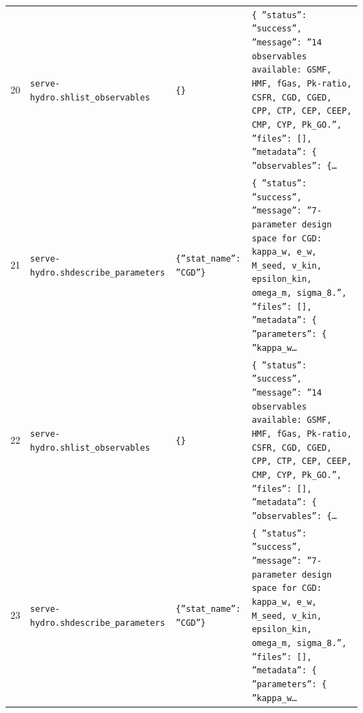 \documentclass[11pt,a4paper]{article}
\begin{document}
\begin{longtable}{@{}p{}p{}p{}p{}@{}}
20 & \texttt{serve-hydro.sh}\newline\texttt{list\_\allowbreak{}observables} & \texttt{\{\}\allowbreak{}} & \texttt{\{   ''status'':\allowbreak{} ''success'',\allowbreak{}   ''message'':\allowbreak{} ''14 observables available:\allowbreak{} GSMF,\allowbreak{} HMF,\allowbreak{} fGas,\allowbreak{} Pk-ratio,\allowbreak{} CSFR,\allowbreak{} CGD,\allowbreak{} CGED,\allowbreak{} CPP,\allowbreak{} CTP,\allowbreak{} CEP,\allowbreak{} CEEP,\allowbreak{} CMP,\allowbreak{} CYP,\allowbreak{} Pk\_\allowbreak{}GO.'',\allowbreak{}   ''files'':\allowbreak{} []\allowbreak{},\allowbreak{}   ''metadata'':\allowbreak{} \{     ''observables'':\allowbreak{} \{\ldots{}\allowbreak{}} \\
21 & \texttt{serve-hydro.sh}\newline\texttt{describe\_\allowbreak{}parameters} & \texttt{\{''stat\_\allowbreak{}name'':\allowbreak{} ''CGD''\}\allowbreak{}} & \texttt{\{   ''status'':\allowbreak{} ''success'',\allowbreak{}   ''message'':\allowbreak{} ''7-parameter design space for CGD:\allowbreak{} kappa\_\allowbreak{}w,\allowbreak{} e\_\allowbreak{}w,\allowbreak{} M\_\allowbreak{}seed,\allowbreak{} v\_\allowbreak{}kin,\allowbreak{} epsilon\_\allowbreak{}kin,\allowbreak{} omega\_\allowbreak{}m,\allowbreak{} sigma\_\allowbreak{}8.'',\allowbreak{}   ''files'':\allowbreak{} []\allowbreak{},\allowbreak{}   ''metadata'':\allowbreak{} \{     ''parameters'':\allowbreak{} \{       ''kappa\_\allowbreak{}w\ldots{}\allowbreak{}} \\
22 & \texttt{serve-hydro.sh}\newline\texttt{list\_\allowbreak{}observables} & \texttt{\{\}\allowbreak{}} & \texttt{\{   ''status'':\allowbreak{} ''success'',\allowbreak{}   ''message'':\allowbreak{} ''14 observables available:\allowbreak{} GSMF,\allowbreak{} HMF,\allowbreak{} fGas,\allowbreak{} Pk-ratio,\allowbreak{} CSFR,\allowbreak{} CGD,\allowbreak{} CGED,\allowbreak{} CPP,\allowbreak{} CTP,\allowbreak{} CEP,\allowbreak{} CEEP,\allowbreak{} CMP,\allowbreak{} CYP,\allowbreak{} Pk\_\allowbreak{}GO.'',\allowbreak{}   ''files'':\allowbreak{} []\allowbreak{},\allowbreak{}   ''metadata'':\allowbreak{} \{     ''observables'':\allowbreak{} \{\ldots{}\allowbreak{}} \\
23 & \texttt{serve-hydro.sh}\newline\texttt{describe\_\allowbreak{}parameters} & \texttt{\{''stat\_\allowbreak{}name'':\allowbreak{} ''CGD''\}\allowbreak{}} & \texttt{\{   ''status'':\allowbreak{} ''success'',\allowbreak{}   ''message'':\allowbreak{} ''7-parameter design space for CGD:\allowbreak{} kappa\_\allowbreak{}w,\allowbreak{} e\_\allowbreak{}w,\allowbreak{} M\_\allowbreak{}seed,\allowbreak{} v\_\allowbreak{}kin,\allowbreak{} epsilon\_\allowbreak{}kin,\allowbreak{} omega\_\allowbreak{}m,\allowbreak{} sigma\_\allowbreak{}8.'',\allowbreak{}   ''files'':\allowbreak{} []\allowbreak{},\allowbreak{}   ''metadata'':\allowbreak{} \{     ''parameters'':\allowbreak{} \{       ''kappa\_\allowbreak{}w\ldots{}\allowbreak{}} \\

\end{longtable}
\end{document}
